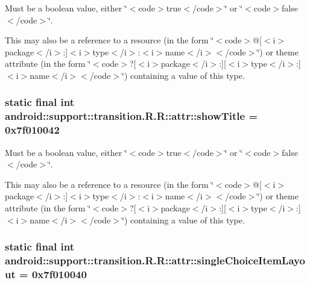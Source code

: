Must be a boolean value, either \char`\"{}$<$code$>$true$<$/code$>$\char`\"{} or \char`\"{}$<$code$>$false$<$/code$>$\char`\"{}. 

This may also be a reference to a resource (in the form \char`\"{}$<$code$>$@\mbox{[}$<$i$>$package$<$/i$>$:\mbox{]}$<$i$>$type$<$/i$>$:$<$i$>$name$<$/i$>$$<$/code$>$\char`\"{}) or theme attribute (in the form \char`\"{}$<$code$>$?\mbox{[}$<$i$>$package$<$/i$>$:\mbox{]}\mbox{[}$<$i$>$type$<$/i$>$:\mbox{]}$<$i$>$name$<$/i$>$$<$/code$>$\char`\"{}) containing a value of this type. \hypertarget{classandroid_1_1support_1_1transition_1_1_r_1_1attr_c272f28acd342801ae85ed664b31c4c5}{
\subsubsection[{showTitle}]{\setlength{\rightskip}{0pt plus 5cm}static final int android::support::transition.R.R::attr::showTitle = 0x7f010042}}
\label{classandroid_1_1support_1_1transition_1_1_r_1_1attr_c272f28acd342801ae85ed664b31c4c5}


Must be a boolean value, either \char`\"{}$<$code$>$true$<$/code$>$\char`\"{} or \char`\"{}$<$code$>$false$<$/code$>$\char`\"{}. 

This may also be a reference to a resource (in the form \char`\"{}$<$code$>$@\mbox{[}$<$i$>$package$<$/i$>$:\mbox{]}$<$i$>$type$<$/i$>$:$<$i$>$name$<$/i$>$$<$/code$>$\char`\"{}) or theme attribute (in the form \char`\"{}$<$code$>$?\mbox{[}$<$i$>$package$<$/i$>$:\mbox{]}\mbox{[}$<$i$>$type$<$/i$>$:\mbox{]}$<$i$>$name$<$/i$>$$<$/code$>$\char`\"{}) containing a value of this type. \hypertarget{classandroid_1_1support_1_1transition_1_1_r_1_1attr_cfeda34189d5be15caae4f87c8d6b11f}{
\subsubsection[{singleChoiceItemLayout}]{\setlength{\rightskip}{0pt plus 5cm}static final int android::support::transition.R.R::attr::singleChoiceItemLayout = 0x7f010040}}
\label{classandroid_1_1support_1_1transition_1_1_r_1_1attr_cfeda34189d5be15caae4f87c8d6b11f}



